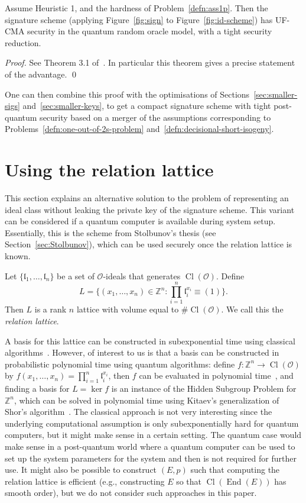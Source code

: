 \documentclass{llncs}
\newcommand{\OO}{\mathcal{O}}
\newcommand{\Z}{\mathbb{Z}}
\DeclareMathOperator{\End}{End}
\DeclareMathOperator{\Cl}{Cl}
\renewcommand{\l}{\mathfrak{l}}
\begin{document}
 

\begin{theorem}
Assume Heuristic 1,  and the hardness of Problem~\ref{defn:ass1p}.
Then the signature scheme (applying Figure~\ref{fig:sign} to Figure~\ref{fig:id-scheme}) has UF-CMA security in the quantum random oracle model, with a tight security reduction.
\end{theorem}
 

\begin{proof}
See Theorem 3.1 of~\cite{KLS18}.
In particular this theorem gives a precise statement of the advantage. \qed
\end{proof}


One can then combine this proof with the optimisations of Sections~\ref{sec:smaller-sigs} and~\ref{sec:smaller-keys}, to get a compact signature scheme with tight post-quantum security based on a merger of the assumptions corresponding to Problems~\ref{defn:one-out-of-2s-problem} and~\ref{defn:decisional-short-isogeny}.


\section{Using the relation lattice}\label{sec:sig-relation-lattice}

This section explains an alternative solution to the problem of representing an ideal class without leaking the private key of the signature scheme.
This variant can be considered if a quantum computer is available during system setup.
Essentially, this is the scheme from Stolbunov's thesis (see Section~\ref{sec:Stolbunov}), which can be used securely once the relation lattice is known.


Let $\{ \l_1, \dots, \l_n \}$ be a set of $\OO$-ideals that generates $\Cl( \OO )$.
Define 
\[
   L = \{ (x_1, \dots, x_n ) \in \Z^n : \prod_{i=1}^n \l_i^{x_i} \equiv (1) \}.
\]
Then $L$ is a rank $n$ lattice with volume equal to $\#\Cl(\OO)$.
We call this the \emph{relation lattice}.

A basis for this lattice can be constructed in subexponential time using classical algorithms~\cite{hafner1989rigorous,biasse_fieker_jacobson_2016}.
However, of interest to us is that a basis can be constructed
in probabilistic polynomial time using quantum algorithms: define $f:\Z^n\to\Cl(\OO)$ by $f(x_1,\dots,x_n)=\prod_{i=1}^n\l_i^{x_i}$, then $f$ can be evaluated in polynomial time~\cite{shanks1989gauss,Cohen1993}, and finding a basis for $L=\ker f$ is an instance of the Hidden Subgroup Problem for $\Z^n$, which can be solved in polynomial time using Kitaev's generalization of Shor's algorithm~\cite{kitaev1995hsp}.
The classical approach is not very interesting since the underlying computational assumption is only subexponentially hard for quantum computers, but it might make sense in a certain setting.
The quantum case would make sense in a post-quantum world where a quantum computer can be used to set up the system parameters for the system and then is not required for further use.
It might also be possible to construct $(E, p )$ such that computing the relation lattice is efficient (e.g., constructing $E$ so that $\Cl( \End(E))$ has smooth order), but we do not consider such approaches in this paper.
\end{document}
